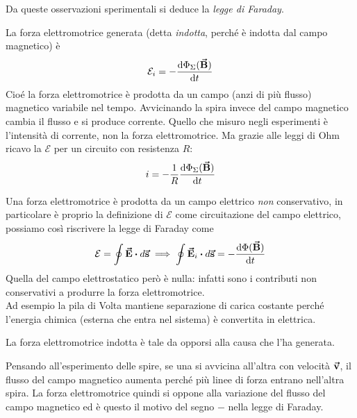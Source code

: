 Da queste osservazioni sperimentali si deduce la \textit{legge di Faraday}.  
\begin{define}
	La forza elettromotrice generata (detta \textit{indotta}, perché è indotta dal campo magnetico) è 
	\begin{equation*}
		\mathcal{E}_i=-\dv{\Phi_\Sigma (\vb*{\va{B}})}{t}
	\end{equation*}
	Cioé la forza elettromotrice è prodotta da un campo (anzi di più flusso) magnetico variabile nel tempo. Avvicinando la spira invece del campo magnetico cambia il flusso e si produce corrente. Quello che misuro negli esperimenti è l'intensità di corrente, non la forza elettromotrice. Ma grazie alle leggi di Ohm ricavo la $\mathcal{E}$ per un circuito con resistenza $R$:
	\begin{equation*}
		i=-\frac{1}{R}\dv{\Phi_\Sigma(\vb*{\va{B}})}{t}
	\end{equation*}
\end{define}

\begin{observe}
	Una forza elettromotrice è prodotta da un campo elettrico \textit{non} conservativo, in particolare è proprio la definizione di $\mathcal{E}$ come circuitazione del campo elettrico, possiamo così riscrivere la legge di Faraday come
	\begin{equation*}
		\mathcal{E}=\oint\vba E\vdot d\vba s \implies \oint \vba E_i\vdot d\vba s =-\dv{\Phi(\vba B)}{t}		
	\end{equation*}
	Quella del campo elettrostatico però è nulla: infatti sono i contributi non conservativi a produrre la forza elettromotrice.\\
	Ad esempio la pila di Volta mantiene separazione di carica costante perché l'energia chimica (esterna che entra nel sistema) è convertita in elettrica. %
\end{observe}

\begin{define}
	La forza elettromotrice indotta è tale da opporsi alla causa che l'ha generata. 
\end{define}
\begin{observe}
	Pensando all'esperimento delle spire, se una si avvicina all'altra con velocità $\vb*{\va{v}}$, il flusso del campo magnetico aumenta perché più linee di forza entrano nell'altra spira. La forza elettromotrice quindi si oppone alla variazione del flusso del campo magnetico ed è questo il motivo del segno $-$ nella legge di Faraday.
\end{observe}

